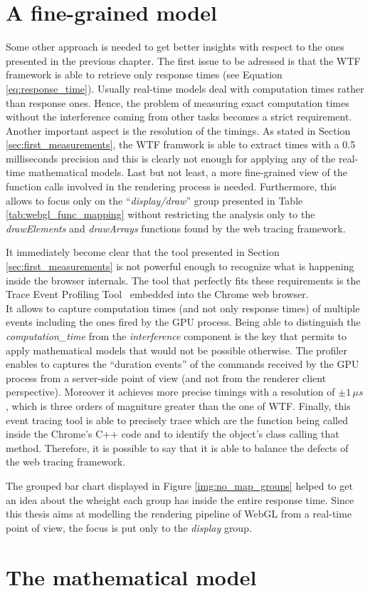 \section{A fine-grained model}
Some other approach is needed to get better insights with respect to the ones
presented in the previous chapter. The first issue to be adressed is that the
WTF framework is able to retrieve only response times (see Equation
\ref{eq:response_time}). Usually real-time models deal with computation times
rather than response ones. Hence, the problem of measuring exact computation
times without the interference coming from other tasks becomes a strict requirement.
Another important aspect is the resolution of the timings. As stated in Section
\ref{sec:first_measurements}, the WTF framwork is able to extract times with a
0.5 milliseconds precision and this is clearly not enough for applying any of
the real-time mathematical models.
Last but not least, a more fine-grained view of the function calls involved in
the rendering process is needed. Furthermore, this allows to focus only on the
``\emph{display/draw}'' group presented in Table \ref{tab:webgl_func_mapping}
without restricting the analysis only to the \emph{drawElements} and
\emph{drawArrays} functions found by the web tracing framework.

It immediately become clear that the tool presented in Section \ref{sec:first_measurements}
is not powerful enough to recognize what is happening inside the browser internals.
The tool that perfectly fits these requirements is the Trace Event Profiling
Tool~\cite{eventprofilertool} embedded into the Chrome web browser.\\
It allows to capture computation times (and not only response times) of multiple
events including the ones fired by the GPU process. Being able to distinguish
the \emph{computation\_time} from the \emph{interference} component is the key
that permits to apply mathematical models that would not be possible otherwise.
The profiler enables to captures the ``duration events'' of the commands received by the GPU
process from a server-side point of view (and not from the renderer client perspective).
Moreover it achieves more precise timings with a resolution of \(\pm 1\,\mu s\),
which is three orders of magniture greater than the one of WTF.
Finally, this event tracing tool is able to precisely trace which are the function
being called inside the Chrome's C++ code and to identify the object's class
calling that method. Therefore, it is possible to say that it is able to balance
the defects of the web tracing framework.

The grouped bar chart displayed in Figure \ref{img:no_map_groups} helped to
get an idea about the wheight each group has inside the entire response time.
Since this thesis aims at modelling the rendering pipeline of WebGL from a real-time
point of view, the focus is put only to the \emph{display} group.



\section{The mathematical model}

